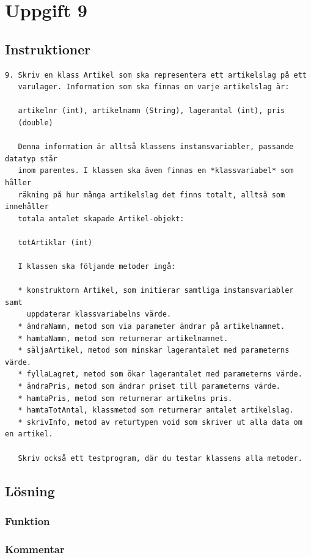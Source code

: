 \section{Uppgift 9}\label{sec:uppg09}

\subsection{Instruktioner}
\begin{verbatim}
9. Skriv en klass Artikel som ska representera ett artikelslag på ett
   varulager. Information som ska finnas om varje artikelslag är:

   artikelnr (int), artikelnamn (String), lagerantal (int), pris
   (double)

   Denna information är alltså klassens instansvariabler, passande datatyp står
   inom parentes. I klassen ska även finnas en *klassvariabel* som håller
   räkning på hur många artikelslag det finns totalt, alltså som innehåller
   totala antalet skapade Artikel-objekt:

   totArtiklar (int)

   I klassen ska följande metoder ingå:

   * konstruktorn Artikel, som initierar samtliga instansvariabler samt
     uppdaterar klassvariabelns värde.
   * ändraNamn, metod som via parameter ändrar på artikelnamnet.
   * hamtaNamn, metod som returnerar artikelnamnet.
   * säljaArtikel, metod som minskar lagerantalet med parameterns värde.
   * fyllaLagret, metod som ökar lagerantalet med parameterns värde.
   * ändraPris, metod som ändrar priset till parameterns värde.
   * hamtaPris, metod som returnerar artikelns pris.
   * hamtaTotAntal, klassmetod som returnerar antalet artikelslag.
   * skrivInfo, metod av returtypen void som skriver ut alla data om en artikel.

   Skriv också ett testprogram, där du testar klassens alla metoder.
\end{verbatim}


\subsection{Lösning}
\subsubsection{Funktion}

\subsubsection{Kommentar}


